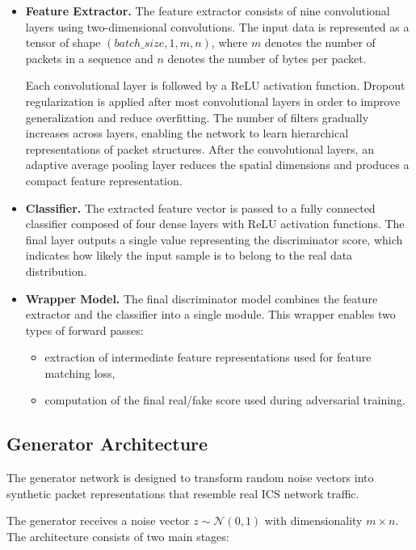 \begin{itemize}

\item \textbf{Feature Extractor.}  
The feature extractor consists of nine convolutional layers using two-dimensional convolutions. The input data is represented as a tensor of shape $(batch\_size, 1, m, n)$, where $m$ denotes the number of packets in a sequence and $n$ denotes the number of bytes per packet. 

Each convolutional layer is followed by a ReLU activation function. Dropout regularization is applied after most convolutional layers in order to improve generalization and reduce overfitting. The number of filters gradually increases across layers, enabling the network to learn hierarchical representations of packet structures. After the convolutional layers, an adaptive average pooling layer reduces the spatial dimensions and produces a compact feature representation.

\item \textbf{Classifier.}  
The extracted feature vector is passed to a fully connected classifier composed of four dense layers with ReLU activation functions. The final layer outputs a single value representing the discriminator score, which indicates how likely the input sample is to belong to the real data distribution.

\item \textbf{Wrapper Model.}  
The final discriminator model combines the feature extractor and the classifier into a single module. This wrapper enables two types of forward passes:
\begin{itemize}
\item extraction of intermediate feature representations used for feature matching loss,
\item computation of the final real/fake score used during adversarial training.
\end{itemize}

\end{itemize}

\subsection{Generator Architecture}

The generator network is designed to transform random noise vectors into synthetic packet representations that resemble real ICS network traffic.

The generator receives a noise vector $z \sim \mathcal{N}(0,1)$ with dimensionality $m \times n$. The architecture consists of two main stages:

